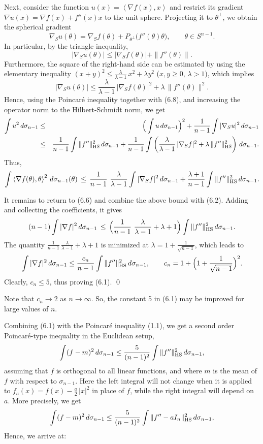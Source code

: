 \documentclass[reqno,12pt]{amsart}
\theoremstyle{plain}
\begin{document}
Next, consider the function $u(x) = \left<\nabla f(x),x\right>$ and
restrict its gradient $\nabla u(x) = \nabla f(x) + f''(x)x$ to the unit 
sphere. Projecting it to $\theta^\perp$, we obtain the spherical gradient
$$
\nabla_S u(\theta) = \nabla_S f(\theta) + 
P_{\theta^\perp} \big(f''(\theta)\theta\big), \qquad \theta \in S^{n-1}.
$$
In particular, by the triangle inequality,
$$
|\nabla_S u(\theta)| \leq |\nabla_S f(\theta)| + \|f''(\theta)\|.
$$
Furthermore, the square of the right-hand side can be estimated by using 
the elementary inequality 
$(x+y)^2 \leq \frac{\lambda}{\lambda-1}\, x^2 + \lambda y^2$ 
($x,y \geq 0$, $\lambda>1$), which implies
$$
|\nabla_S u(\theta)| \leq
\frac{\lambda}{\lambda-1}\,|\nabla_S f(\theta)|^2 + \lambda\,\|f''(\theta)\|^2.
$$
Hence, using the Poincar\'e inequality together with (6.8), 
and increasing the operator norm to the Hilbert-Schmidt norm, we get
\begin{eqnarray*}
\int u^2\,d\sigma_{n-1} 
 & \leq &
\Big(\int u\, d\sigma_{n-1}\Big)^2 + \frac{1}{n-1}
\int |\nabla_S u|^2\, d\sigma_{n-1} \\
 & \leq &
\frac{1}{n-1} \int \|f''\|_{\rm HS}^2\,d\sigma_{n-1}+
\frac{1}{n-1} \int \left(\frac{\lambda}{\lambda-1}\,
|\nabla_S f|^2 + \lambda\,\|f''\|_{\rm HS}^2\right)\, d\sigma_{n-1}.
\end{eqnarray*}
Thus,
$$
\int \left<\nabla f(\theta),\theta\right>^2\,d\sigma_{n-1}(\theta) 
 \, \leq \,
\frac{1}{n-1} \ \frac{\lambda}{\lambda-1} \int |\nabla_S f|^2\, d\sigma_{n-1}
+ \frac{\lambda+1}{n-1} \int \|f''\|_{\rm HS}^2\,d\sigma_{n-1}.
$$

It remains to return to (6.6) and combine the above bound with (6.2).
Adding and collecting the coefficients, it gives
$$
(n-1) \int |\nabla f|^2\, d\sigma_{n-1} \, \leq \,
\Big(\frac{1}{n-1} \ \frac{\lambda}{\lambda-1} + \lambda + 1\Big) 
\int \|f''\|_{\rm HS}^2\,d\sigma_{n-1}.
$$
The quantity $\frac{1}{n-1}\,\frac{\lambda}{\lambda-1} + \lambda + 1$ 
is minimized at $\lambda = 1 + \frac{1}{\sqrt{n-1}}$, which leads to
\begin{equation}
\int |\nabla f|^2\,d\sigma_{n-1} \leq \frac{c_n}{n-1}
\int \|f''\|_{\rm HS}^2\,d\sigma_{n-1}, \qquad
c_n = 1 + \Big(1 + \frac{1}{\sqrt{n-1}}\Big)^2.
\end{equation}
Clearly, $c_n \leq 5$, thus proving (6.1).
\qed

\vskip5mm
Note that $c_n \rightarrow 2$ as $n \rightarrow \infty$.
So, the constant 5 in (6.1) may be improved for large values of $n$.

Combining (6.1) with the Poincar\'e inequality (1.1), we get
a second order Poincar\'e-type inequality in the Euclidean setup,
$$
\int (f-m)^2\,d\sigma_{n-1} \leq \frac{5}{(n-1)^2}
\int \|f''\|_{\rm HS}^2\,d\sigma_{n-1},
$$
assuming that $f$ is orthogonal to all linear functions, and where $m$ 
is the mean of $f$ with respect to $\sigma_{n-1}$. Here the left integral 
will not change when it is applied to 
$f_a(x) = f(x) - \frac{a}{2}\,|x|^2$ in place of $f$, 
while the right integral will depend on $a$. More precisely, we get
$$
\int (f-m)^2\,d\sigma_{n-1} \leq \frac{5}{(n-1)^2}
\int \|f'' - aI_n\|_{\rm HS}^2\,d\sigma_{n-1},
$$
Hence, we arrive at:
\end{document}
